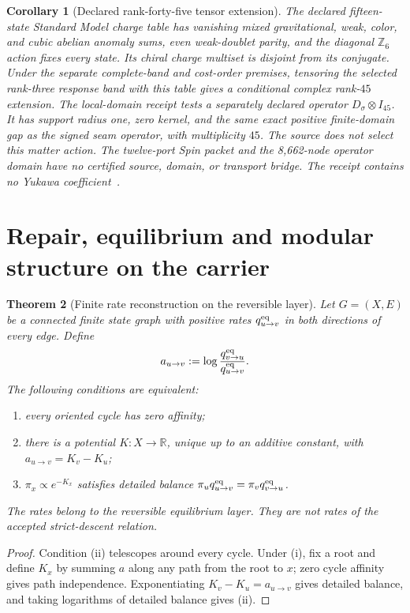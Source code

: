 \documentclass[11pt]{article}
\newtheorem{theorem}{Theorem}[section]
\newtheorem{corollary}[theorem]{Corollary}
\theoremstyle{remark}
\theoremstyle{plain}
\begin{document}
\begin{corollary}[Declared rank-forty-five tensor extension]
\label{cor:finite-rank45-matter-attachment}
The declared fifteen-state Standard Model charge table has vanishing mixed gravitational,
weak, color, and cubic abelian anomaly sums, even weak-doublet parity, and the
diagonal \(\mathbb Z_6\) action fixes every state. Its chiral charge multiset is
disjoint from its conjugate. Under the separate complete-band and cost-order
premises, tensoring the selected rank-three response band with this table gives
a conditional complex rank-\(45\) extension. The local-domain receipt tests a
separately declared operator \(D_\sigma\otimes I_{45}\). It has support radius
one, zero kernel, and the same exact positive finite-domain gap as the signed
seam operator, with multiplicity \(45\). The source does not select this matter
action. The twelve-port Spin packet and the 8,662-node operator domain have no
certified source, domain, or transport bridge. The receipt contains no Yukawa
coefficient~\cite{ophfpe}.
\end{corollary}

\section{Repair, equilibrium and modular structure on the carrier}
\label{sec:repair-equilibrium-modular}

\begin{theorem}[Finite rate reconstruction on the reversible layer]
Let \(G=(X,E)\) be a connected finite state graph with positive rates
\(q_{u\to v}^{\rm eq}\) in both directions of every edge. Define
\[
a_{u\to v}:=\log\frac{q_{v\to u}^{\rm eq}}{q_{u\to v}^{\rm eq}}.
\]
The following conditions are equivalent:
\begin{enumerate}[label=\textup{(\roman*)},leftmargin=2em]
\item every oriented cycle has zero affinity;
\item there is a potential \(K:X\to\mathbb R\), unique up to an additive constant, with
\(a_{u\to v}=K_v-K_u\);
\item \(\pi_x\propto e^{-K_x}\) satisfies detailed balance
\(\pi_uq_{u\to v}^{\rm eq}=\pi_vq_{v\to u}^{\rm eq}\).
\end{enumerate}
The rates belong to the reversible equilibrium layer. They are not rates of the accepted
strict-descent relation.
\end{theorem}

\begin{proof}
Condition \textup{(ii)} telescopes around every cycle. Under \textup{(i)}, fix a root and define
\(K_x\) by summing \(a\) along any path from the root to \(x\); zero cycle affinity gives path
independence. Exponentiating \(K_v-K_u=a_{u\to v}\) gives detailed balance, and taking logarithms
of detailed balance gives \textup{(ii)}.
\end{proof}
\end{document}
